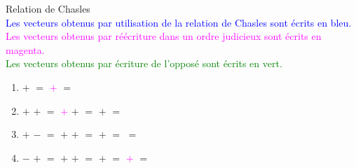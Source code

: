 \hrulefill


\exercice Relation de Chasles\\
\textcolor{blue}{Les vecteurs obtenus par utilisation de la relation de Chasles sont écrits en bleu.}\\
\textcolor{magenta}{Les vecteurs obtenus par réécriture dans un ordre judicieux sont écrits en magenta.}\\
\textcolor{green}{Les vecteurs obtenus par écriture de l'opposé sont écrits en vert.}

\begin{enumerate}
	\item	{} $+$  $=$
			\textcolor{magenta}{ $+$ } $=$
			\textcolor{blue}{}

	\item	{} $+$  $+$  $=$
			\textcolor{magenta}{ $+$ } $+$  $=$
			\textcolor{blue}{} $+$  $=$
			\textcolor{blue}{}
	\item	{} $+$  $-$  $=$
			 $+$  $+$ \textcolor{green}{} $=$
			 $+$ \textcolor{blue}{} $=$
			\textcolor{blue}{} $=$
			\textcolor{red}{}
	\item	{} $-$  $+$  $=$
			 $+$ \textcolor{green}{} $+$  $=$ 
			\textcolor{blue}{} $+$  $=$
			\textcolor{magenta}{ $+$ } $=$
			\textcolor{blue}{}
\end{enumerate}

\newpage

